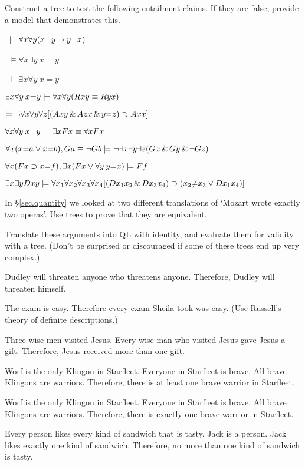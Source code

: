 \solutions
\problempart Construct a tree to test the following entailment claims. If they are false, provide a model that demonstrates this.
\label{pr.IdentityTrees}
\begin{earg}
\item\  $\models \forall x \forall y (x{=}y \supset y{=}x)$
\item\ $\models \forall x \exists y \: x{=}y$
\item\  $\models \exists x \forall y \: x{=}y$
\item   $\exists x \forall y \: x{=}y \models \forall x \forall y (Rxy \equiv Ryx)$
\item   $\models \neg \forall x \forall y \forall z [(Axy \,\&\, Azx \,\&\, y{=}z) \supset Axx] $
\item  $\forall x \forall y \: x{=}y \models \exists x Fx \equiv \forall x Fx$
\item $\forall x (x{=}a \vee x{=}b), Ga \equiv \neg Gb \models \neg \exists x \exists y \exists z (Gx \,\&\, Gy \,\&\, \neg Gz)$
\item $\forall x (Fx \supset x{=}f), \exists x (Fx \vee \forall y \: y{=}x) \models Ff$
\item $\exists x \exists y Dxy \models \forall x_{1} \forall x_{2} \forall x_{3} \forall x_{4} [(Dx_{1}x_{2} \,\&\, Dx_{3}x_{4}) \supset (x_{2}{\neq}x_{3} \vee Dx_{1}x_{4})]$
\end{earg}

\problempart In \S \ref{sec.quantity} we looked at two different translations of `Mozart wrote exactly two operas'. Use trees to prove that they are equivalent.

\problempart Translate these arguments into QL with identity, and evaluate them for validity with a tree. (Don't be surprised or discouraged if some of these trees end up very complex.)
\label{pr.IdentityArguments}
\begin{earg}
\item Dudley will threaten anyone who threatens anyone. Therefore, Dudley will threaten himself.
\item The exam is easy. Therefore every exam Sheila took was easy. (Use Russell's theory of definite descriptions.)
\item Three wise men visited Jesus. Every wise man who visited Jesus gave Jesus a gift. Therefore, Jesus received more than one gift.
\item Worf is the only Klingon in Starfleet. Everyone in Starfleet is brave. All brave Klingons are warriors. Therefore, there is at least one brave warrior in Starfleet.
\item Worf is the only Klingon in Starfleet. Everyone in Starfleet is brave. All brave Klingons are warriors. Therefore, there is exactly one brave warrior in Starfleet.
\item Every person likes every kind of sandwich that is tasty. Jack is a person. Jack likes exactly one kind of sandwich. Therefore, no more than one kind of sandwich is tasty.
\end{earg}